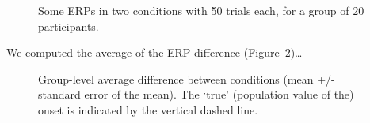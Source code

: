 \documentclass[
  doc,
  floatsintext,
  longtable,
  a4paper,
  nolmodern,
  notxfonts,
  notimes,
  colorlinks=true,linkcolor=blue,citecolor=blue,urlcolor=blue]{apa7}
\begin{document}
\begin{figure}[!htb]

\caption{\label{fig-eeg}Some ERPs in two conditions with 50 trials each,
for a group of 20 participants.}


\end{figure}%

We computed the average of the ERP difference
(Figure~\ref{fig-erp})\ldots{}

\begin{figure}[!htb]

\caption{\label{fig-erp}Group-level average difference between
conditions (mean +/- standard error of the mean). The `true' (population
value of the) onset is indicated by the vertical dashed line.}


\end{figure}%
\end{document}
